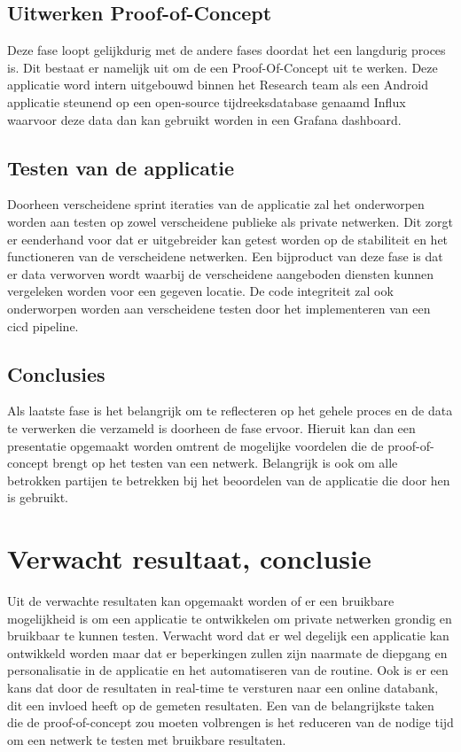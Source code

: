 \subsection{Uitwerken Proof-of-Concept}
\label{subsub:uitwerking}

Deze fase loopt gelijkdurig met de andere fases doordat het een langdurig proces is. Dit bestaat er namelijk uit om de een Proof-Of-Concept uit te werken. Deze applicatie word intern uitgebouwd binnen het Research team als een Android applicatie steunend op een open-source tijdreeksdatabase genaamd Influx waarvoor deze data dan kan gebruikt worden in een Grafana dashboard.

\subsection{Testen van de applicatie}
\label{subsub:testfase}

Doorheen verscheidene sprint iteraties van de applicatie zal het onderworpen worden aan testen op zowel verscheidene publieke als private netwerken. Dit zorgt er eenderhand voor dat er uitgebreider kan getest worden op de stabiliteit en het functioneren van de verscheidene netwerken. Een bijproduct van deze fase is dat er data verworven wordt waarbij de verscheidene aangeboden diensten kunnen vergeleken worden voor een gegeven locatie. De code integriteit zal ook onderworpen worden aan verscheidene testen door het implementeren van een cicd pipeline.

\subsection{Conclusies}
\label{subsub:conclusies}

Als laatste fase is het belangrijk om te reflecteren op het gehele proces en de data te verwerken die verzameld is doorheen de fase ervoor. Hieruit kan dan een presentatie opgemaakt worden omtrent de mogelijke voordelen die de proof-of-concept brengt op het testen van een netwerk. Belangrijk is ook om alle betrokken partijen te betrekken bij het beoordelen van de applicatie die door hen is gebruikt. 



\section{Verwacht resultaat, conclusie}%
\label{sec:verwachte_resultaten}

Uit de verwachte resultaten kan opgemaakt worden of er een bruikbare mogelijkheid is om een applicatie te ontwikkelen om private netwerken grondig en bruikbaar te kunnen testen. Verwacht word dat er wel degelijk een applicatie kan ontwikkeld worden maar dat er beperkingen zullen zijn naarmate de diepgang en personalisatie in de applicatie en het automatiseren van de routine. Ook is er een kans dat door de resultaten in real-time te versturen naar een online databank, dit een invloed heeft op de gemeten resultaten. Een van de belangrijkste taken die de proof-of-concept zou moeten volbrengen is het reduceren van de nodige tijd om een netwerk te testen met bruikbare resultaten. 
